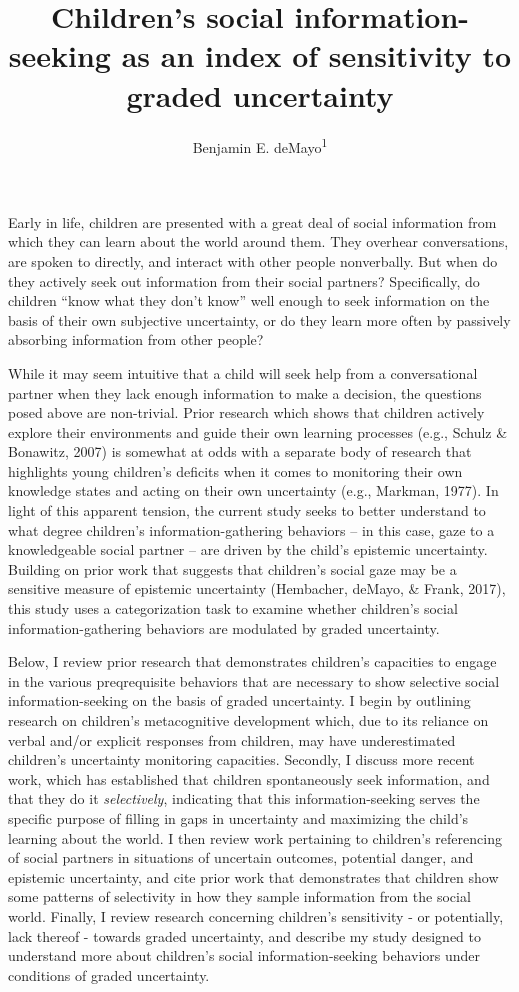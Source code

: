\documentclass[floatsintext,man]{apa6}
\title{Children's social information-seeking as an index of sensitivity to
graded uncertainty}
\author{Benjamin E. deMayo\textsuperscript{1}}
\affiliation{
    \vspace{0.5cm}
          \textsuperscript{1} Stanford University  }
\theoremstyle{definition}
\theoremstyle{definition}
\theoremstyle{definition}
\theoremstyle{remark}
\begin{document}
\maketitle

\setcounter{secnumdepth}{0}



Early in life, children are presented with a great deal of social
information from which they can learn about the world around them. They
overhear conversations, are spoken to directly, and interact with other
people nonverbally. But when do they actively seek out information from
their social partners? Specifically, do children \enquote{know what they
don't know} well enough to seek information on the basis of their own
subjective uncertainty, or do they learn more often by passively
absorbing information from other people?

While it may seem intuitive that a child will seek help from a
conversational partner when they lack enough information to make a
decision, the questions posed above are non-trivial. Prior research
which shows that children actively explore their environments and guide
their own learning processes (e.g., Schulz \& Bonawitz, 2007) is
somewhat at odds with a separate body of research that highlights young
children's deficits when it comes to monitoring their own knowledge
states and acting on their own uncertainty (e.g., Markman, 1977). In
light of this apparent tension, the current study seeks to better
understand to what degree children's information-gathering behaviors --
in this case, gaze to a knowledgeable social partner -- are driven by
the child's epistemic uncertainty. Building on prior work that suggests
that children's social gaze may be a sensitive measure of epistemic
uncertainty (Hembacher, deMayo, \& Frank, 2017), this study uses a
categorization task to examine whether children's social
information-gathering behaviors are modulated by graded uncertainty.

Below, I review prior research that demonstrates children's capacities
to engage in the various preqrequisite behaviors that are necessary to
show selective social information-seeking on the basis of graded
uncertainty. I begin by outlining research on children's metacognitive
development which, due to its reliance on verbal and/or explicit
responses from children, may have underestimated children's uncertainty
monitoring capacities. Secondly, I discuss more recent work, which has
established that children spontaneously seek information, and that they
do it \emph{selectively}, indicating that this information-seeking
serves the specific purpose of filling in gaps in uncertainty and
maximizing the child's learning about the world. I then review work
pertaining to children's referencing of social partners in situations of
uncertain outcomes, potential danger, and epistemic uncertainty, and
cite prior work that demonstrates that children show some patterns of
selectivity in how they sample information from the social world.
Finally, I review research concerning children's sensitivity - or
potentially, lack thereof - towards graded uncertainty, and describe my
study designed to understand more about children's social
information-seeking behaviors under conditions of graded uncertainty.
\end{document}
